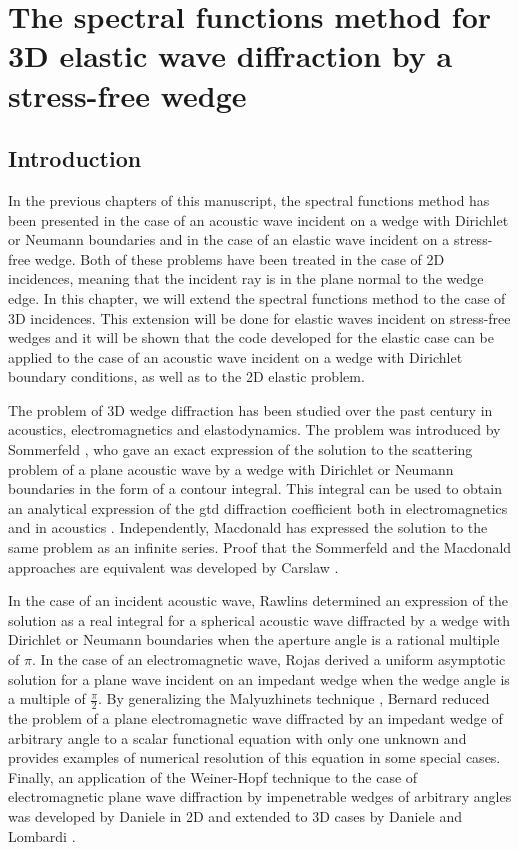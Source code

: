 \chapter[][3D Elastic Case]{The spectral functions method for 3D elastic wave diffraction by a stress-free wedge}
\label{chap-3D}

\section*{Introduction}

In the previous chapters of this manuscript, the spectral functions method has been presented in the case of an acoustic wave incident on a wedge with Dirichlet or Neumann boundaries and in the case of an elastic wave incident on a stress-free wedge. Both of these problems have been treated in the case of 2D incidences, meaning that the incident ray is in the plane normal to the wedge edge. In this chapter, we will extend the spectral functions method to the case of 3D incidences. This extension will be done for elastic waves incident on stress-free wedges and it will be shown that the code developed for the elastic case can be applied to the case of an acoustic wave incident on a wedge with Dirichlet boundary conditions, as well as to the 2D elastic problem.

The problem of 3D wedge diffraction has been studied over the past century in acoustics, electromagnetics and elastodynamics. The problem was introduced by Sommerfeld \cite{Sommerfeld}, who gave an exact expression of the solution to the scattering problem of a plane acoustic wave by a wedge with Dirichlet or Neumann boundaries in the form of a contour integral. This integral can be used to obtain an analytical expression of the \acrfull{gtd} diffraction coefficient both in electromagnetics and in acoustics \cite{Bouche,Bo}. Independently, Macdonald \cite{Macdo} has expressed the solution to the same problem as an infinite series. Proof that the Sommerfeld and the Macdonald approaches are equivalent was developed by Carslaw \cite{Carslaw}.

In the case of an incident acoustic wave, Rawlins \cite{Rawlins} determined an expression of the solution as a real integral for a spherical acoustic wave diffracted by a wedge with Dirichlet or Neumann boundaries when the aperture angle is a rational multiple of $\pi$. In the case of an electromagnetic wave, Rojas \cite{Rojas} derived a uniform asymptotic solution for a plane wave incident on an impedant wedge when the wedge angle is a multiple of $\frac{\pi}{2}$. By generalizing the Malyuzhinets technique \cite{SMtechnique}, Bernard \cite{Bernard} reduced the problem of a plane electromagnetic wave diffracted by an impedant wedge of arbitrary angle to a scalar functional equation with only one unknown and provides examples of numerical resolution of this equation in some special cases. Finally, an application of the Weiner-Hopf technique to the case of electromagnetic plane wave diffraction by impenetrable wedges of arbitrary angles was developed by Daniele in 2D \cite{Daniele} and extended to 3D cases by Daniele and Lombardi \cite{DanieleLombardi}.

